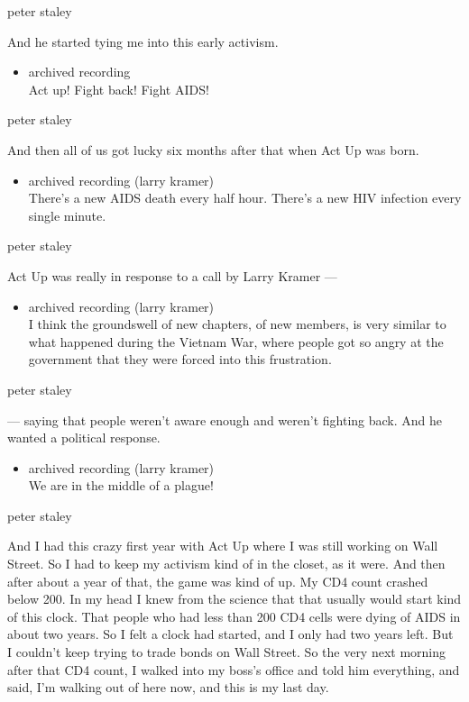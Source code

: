 peter staley

And he started tying me into this early activism.

\begin{itemize}
\tightlist
\item
  archived recording\\
  Act up! Fight back! Fight AIDS!
\end{itemize}

peter staley

And then all of us got lucky six months after that when Act Up was born.

\begin{itemize}
\tightlist
\item
  archived recording (larry kramer)\\
  There's a new AIDS death every half hour. There's a new HIV infection
  every single minute.
\end{itemize}

peter staley

Act Up was really in response to a call by Larry Kramer ---

\begin{itemize}
\tightlist
\item
  archived recording (larry kramer)\\
  I think the groundswell of new chapters, of new members, is very
  similar to what happened during the Vietnam War, where people got so
  angry at the government that they were forced into this frustration.
\end{itemize}

peter staley

--- saying that people weren't aware enough and weren't fighting back.
And he wanted a political response.

\begin{itemize}
\tightlist
\item
  archived recording (larry kramer)\\
  We are in the middle of a plague!
\end{itemize}

peter staley

And I had this crazy first year with Act Up where I was still working on
Wall Street. So I had to keep my activism kind of in the closet, as it
were. And then after about a year of that, the game was kind of up. My
CD4 count crashed below 200. In my head I knew from the science that
that usually would start kind of this clock. That people who had less
than 200 CD4 cells were dying of AIDS in about two years. So I felt a
clock had started, and I only had two years left. But I couldn't keep
trying to trade bonds on Wall Street. So the very next morning after
that CD4 count, I walked into my boss's office and told him everything,
and said, I'm walking out of here now, and this is my last day.

